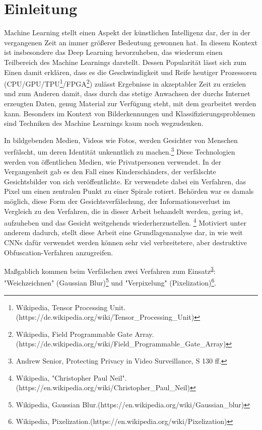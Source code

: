 \section{Einleitung}

Machine Learning stellt einen Aspekt der künstlichen Intelligenz dar, der in der vergangenen Zeit an immer größerer
Bedeutung gewonnen hat. In diesem Kontext ist insbesondere das Deep Learning hevorzuheben, das wiederum einen Teilbereich
des Machine Learnings darstellt. Dessen Popularität lässt sich zum Einen damit erklären, dass es die Geschwindigkeit und
Reife heutiger Prozessoren (CPU/GPU/TPU\footnote{Wikipedia, Tensor Processing Unit.\newline
(https://de.wikipedia.org/wiki/Tensor\_Processing\_Unit)}/FPGA\footnote{Wikipedia, Field Programmable Gate Array.\newline
(https://de.wikipedia.org/wiki/Field\_Programmable\_Gate\_Array)})
zulässt Ergebnisse in akzeptabler Zeit zu erzielen und zum Anderen damit, dass durch das stetige Anwachsen der durchs Internet
erzeugten Daten, genug Material zur Verfügung steht, mit dem gearbeitet werden kann. Besonders im Kontext von Bilderkennungen
und Klassifizierungsproblemen sind Techniken des Machine Learnings kaum noch wegzudenken.

In bildgebenden Medien, Videos wie Fotos, werden Gesichter von Menschen verfälscht, um deren Identität unkenntlich
zu machen.\footnote{Andrew Senior, Protecting Privacy in Video Surveillance, S 130 ff.\label{fn:protecting_privacy}}
Diese Technologien werden von
öffentlichen Medien, wie Privatpersonen verwendet. In der Vergangenheit
gab es den Fall eines Kinderschänders, der verfälschte Gesichtsbilder von sich veröffentlichte. Er verwendete dabei
ein Verfahren, das Pixel um einen zentralen Punkt zu einer Spirale rotiert. Behörden war es damals möglich, diese
Form der Gesichtsverfälschung, der Informationsverlust im Vergleich zu den Verfahren, die in dieser Arbeit behandelt
werden, gering ist, aufzuheben und das Gesicht weitgehends wiederherzustellen.
\footnote{Wikipedia, "Christopher Paul Neil".\newline(https://en.wikipedia.org/wiki/Christopher\_Paul\_Neil)}
Motiviert unter anderem dadurch,
stellt diese Arbeit eine Grundlagenanalyse dar, in wie weit CNNs dafür verwendet werden können sehr viel verbreitetere,
aber destruktive Obfuscation-Verfahren anzugreifen.

Maßgablich kommen beim Verfälschen zwei Verfahren zum Einsatz\textsuperscript{\ref{fn:protecting_privacy}}:
"Weichzeichnen" (Gaussian Blur)\footnote{Wikipedia, Gaussian Blur.\newline(https://en.wikipedia.org/wiki/Gaussian\_blur)}
 und "Verpixelung" (Pixelization)\footnote{Wikipedia, Pixelization.\newline(https://en.wikipedia.org/wiki/Pixelization)\label{label:pixelization}}.


